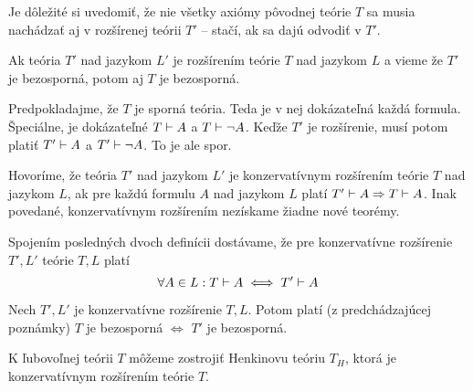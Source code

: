\begin{poznamka}
    Je dôležité si uvedomiť, že nie všetky axiómy pôvodnej teórie $T$
    sa musia nachádzať aj v rozšírenej teórii $T'$ -- 
    stačí, ak sa dajú odvodiť v $T'$.
\end{poznamka}

\begin{poznamka}
 Ak teória $T'$ nad jazykom $L'$ je rozšírením teórie $T$ nad jazykom
 $L$ a vieme že $T'$ je bezosporná, potom aj $T$ je bezosporná.
\end{poznamka}
\begin{dokaz}
    Predpokladajme, že $T$ je sporná teória. Teda je v nej dokázateľná
    každá formula.
    Špeciálne, je dokázateľné $T \vdash A$ a $T \vdash \neg A$.
    Keďže $T'$ je rozšírenie, musí potom platiť
    $T' \vdash A$ a $T' \vdash \neg A$. To je ale spor.
\end{dokaz}

\begin{definicia}
    Hovoríme, že teória $T'$ nad jazykom $L'$ je konzervatívnym
    rozšírením teórie $T$ nad jazykom $L$, ak pre každú formulu
    $A$ nad jazykom $L$ platí $T' \vdash A \Rightarrow T \vdash A$.
    Inak povedané, konzervatívnym rozšírením nezískame žiadne nové 
    teorémy.
\end{definicia}

\begin{poznamka}
    Spojením posledných dvoch definícii dostávame, že pre
    konzervatívne rozšírenie $T',L'$ teórie $T,L$ platí
    \begin{equation*}
        \forall A \in L: T \vdash A \iff T' \vdash A
    \end{equation*}
\end{poznamka}

\begin{poznamka}
    Nech $T',L'$ je konzervatívne rozšírenie $T,L$. Potom platí (z
    predchádzajúcej poznámky)
    $T$ je bezosporná $\iff$ $T'$ je bezosporná.
\end{poznamka}

\begin{veta}[Henkinova] 
    K ľubovoľnej teórii $T$ môžeme zostrojiť Henkinovu
    teóriu $T_H$, ktorá je konzervatívnym rozšírením teórie $T$.
\end{veta}    

